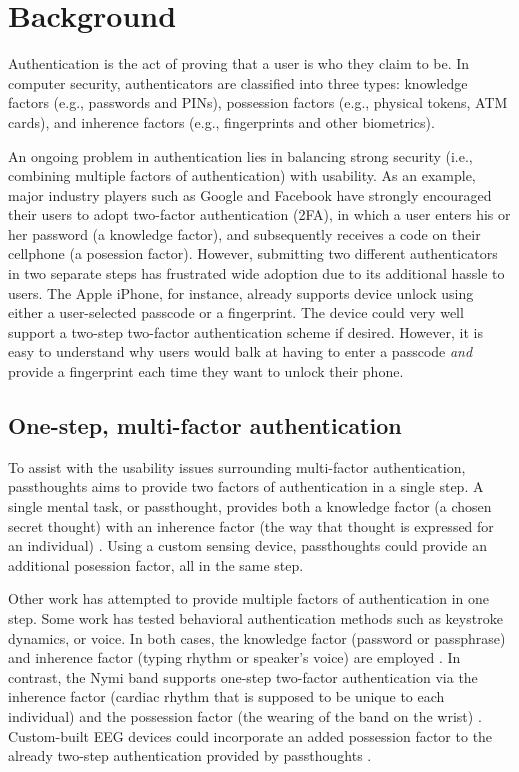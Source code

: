 \documentclass[sigconf]{acmart}
\begin{document}
\section{Background}
\label{sec:org1286678}

Authentication is the act of proving that a user is who they claim to be.
In computer security, authenticators are classified into three types: knowledge factors (e.g., passwords
and PINs), possession factors (e.g., physical tokens, ATM cards), and inherence
factors (e.g., fingerprints and other biometrics). 

An ongoing problem in authentication lies in balancing strong security
(i.e., combining multiple factors of authentication)
with usability.
As an example, major industry players such as Google and
Facebook have strongly encouraged their users to adopt two-factor
authentication (2FA), in which a user enters his or her password (a knowledge factor),
and subsequently receives a code on their cellphone (a posession factor).
However, submitting two different 
authenticators in two separate steps has frustrated wide adoption
due to its additional hassle to users. The Apple iPhone, for instance,
already supports device unlock using either a user-selected passcode or a fingerprint. The
device could very well support a two-step two-factor authentication scheme if
desired. However, it is easy to understand why users would balk at having to
enter a passcode \emph{and} provide a fingerprint each time they want to unlock their phone.

\subsection{One-step, multi-factor authentication}
\label{sec:orgc34f372}

To assist with the usability issues surrounding multi-factor authentication,
passthoughts aims to provide two factors of authentication in a single step.
A single mental task, or passthought, provides both a knowledge factor (a chosen secret thought)
with an inherence factor (the way that thought is expressed for an individual) \cite{Chuang2013b,Johnson2014}.
Using a custom sensing device, passthoughts could provide an additional posession factor, all in the same step.

Other work has attempted to provide multiple factors of authentication in one step.
Some work has tested behavioral authentication methods such as keystroke dynamics, or voice. In both cases, the knowledge factor (password or passphrase) and
inherence factor (typing rhythm or speaker's voice) are employed \cite{Monrose1997}.
In contrast, the Nymi band supports one-step two-factor authentication via the inherence
factor (cardiac rhythm that is supposed to be unique to each individual) and the
possession factor (the wearing of the band on the wrist) \cite{Nymi}.
Custom-built EEG devices could incorporate an added possession factor 
to the already two-step authentication provided by passthoughts \cite{Curran2017}.
\end{document}
